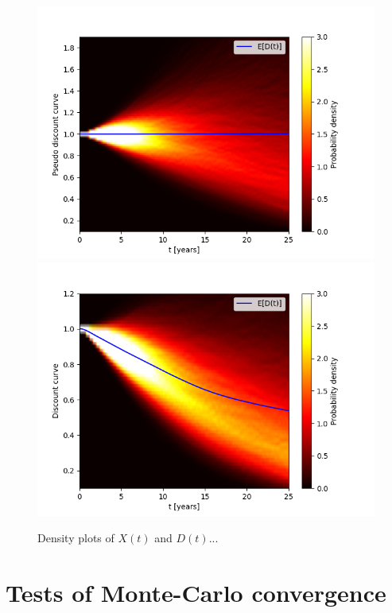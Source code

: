 \begin{figure}
\centering
\includegraphics[scale=0.7]{figures/pseudo_discount_density.png}
\includegraphics[scale=0.7]{figures/discount_density.png}
\caption{Density plots of $X(t)$ and $D(t)$...}
\end{figure}

\section{Tests of Monte-Carlo convergence}
